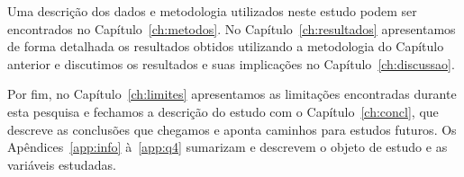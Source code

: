 Uma descrição dos dados e metodologia utilizados neste estudo podem ser encontrados no Capítulo~\ref{ch:metodos}. No Capítulo~\ref{ch:resultados} apresentamos de forma detalhada os resultados obtidos utilizando a metodologia do Capítulo anterior e discutimos os resultados e suas implicações no Capítulo~\ref{ch:discussao}.

Por fim, no Capítulo~\ref{ch:limites} apresentamos as limitações encontradas durante esta pesquisa e fechamos a descrição do estudo com o Capítulo~\ref{ch:concl}, que descreve as conclusões que chegamos e aponta caminhos para estudos futuros. Os Apêndices~\ref{app:info} à~\ref{app:q4} sumarizam e descrevem o objeto de estudo e as variáveis estudadas.


